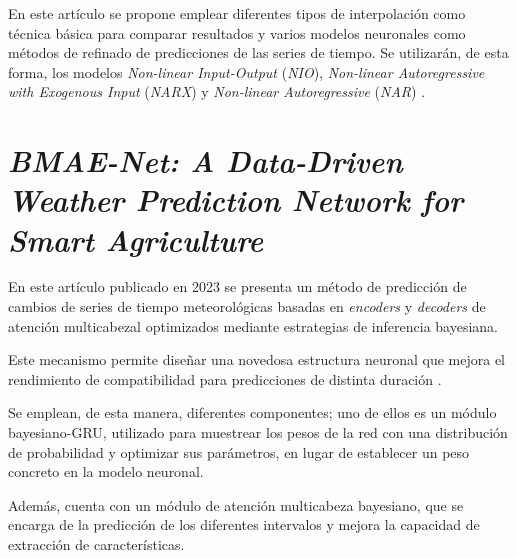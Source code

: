 En este artículo se propone emplear diferentes tipos de interpolación como técnica básica para
comparar resultados y varios modelos neuronales como métodos de refinado de predicciones de las series de tiempo. 
Se utilizarán, de esta forma, los modelos \textit{Non-linear Input-Output} (\textit{NIO}), 
\textit{Non-linear Autoregressive with Exogenous Input} (\textit{NARX}) y \textit{Non-linear Autoregressive} (\textit{NAR}) \cite{article:baseca2022}.

\section{\textit{BMAE-Net: A Data-Driven Weather Prediction Network for Smart Agriculture}}
En este artículo publicado en 2023 se presenta un método de predicción de cambios de series de tiempo
meteorológicas basadas en \textit{encoders} y \textit{decoders} de atención multicabezal
\cite{article:kong2023} optimizados mediante estrategias de inferencia bayesiana. 

Este mecanismo permite diseñar una novedosa estructura neuronal que mejora el 
rendimiento de compatibilidad para predicciones de distinta duración \cite{article:kong2023}.  

Se emplean, de esta manera, diferentes componentes; uno de ellos es un módulo bayesiano-GRU, utilizado
para muestrear los pesos de la red con una distribución de probabilidad y optimizar sus parámetros,
en lugar de establecer un peso concreto en la modelo neuronal.

Además, cuenta con un módulo de atención multicabeza bayesiano, que se encarga de la predicción de 
los diferentes intervalos y mejora la capacidad de extracción de características. 
